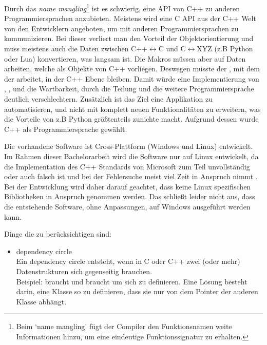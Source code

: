 {      Durch das \emph{name mangling}\footnote{
        Beim `name mangling' fügt der Compiler den Funktionsnamen weite Informationen hinzu, um eine eindeutige Funktionssignatur zu erhalten.
      } ist es schwierig, eine API von C++ zu anderen Programmiersprachen anzubieten. Meistens wird eine C API aus der C++ Welt von den Entwicklern angeboten, um mit anderen Programmiersprachen zu kommunizieren. Bei dieser verliert man den Vorteil der Objektorientierung und muss meistens auch die Daten zwischen C++$\longleftrightarrow$C und C$\longleftrightarrow$XYZ (z.B Python oder Lua) konvertieren, was langsam ist. Die Makros müssen aber auf Daten arbeiten, welche als Objekte von C++ vorliegen. Deswegen müsste der , mit dem der  arbeitet, in der C++ Ebene bleiben. Damit würde eine Implementierung von , ,  und  die Wartbarkeit, durch die Teilung und die weitere Programmiersprache deutlich verschlechtern. Zusätzlich ist das Ziel eine Applikation zu automatisieren, und nicht mit komplett neuen Funktionalitäten zu erweitern, was die Vorteile von z.B Python größtenteils zunichte macht. Aufgrund dessen wurde C++ als Programmiersprache gewählt.

      Die vorhandene Software ist Cross-Plattform (Windows und Linux) entwickelt. Im Rahmen dieser Bachelorarbeit wird die Software nur auf Linux entwickelt, da die Implementation des C++ Standards von Microsoft zum Teil unvollständig oder auch falsch ist und bei der Fehlersuche meist viel Zeit in Anspruch nimmt \autocite{new-ms-compiler}. Bei der Entwicklung wird daher darauf geachtet, dass keine Linux spezifischen Bibliotheken in Anspruch genommen werden. Das schließt leider nicht aus, dass die entstehende Software, ohne Anpassungen, auf Windows ausgeführt werden kann.

      Dinge die zu berücksichtigen sind:
      \begin{itemize}
        \item dependency circle\\
          Ein dependency circle entsteht, wenn in C oder C++ zwei (oder mehr) Datenstrukturen sich gegenseitig brauchen.\\
          Beispiel:  braucht  und  braucht  um sich zu definieren. Eine Lösung besteht darin, eine Klasse so zu definieren, dass sie nur von dem Pointer der anderen Klasse abhängt.


\end{itemize}}
